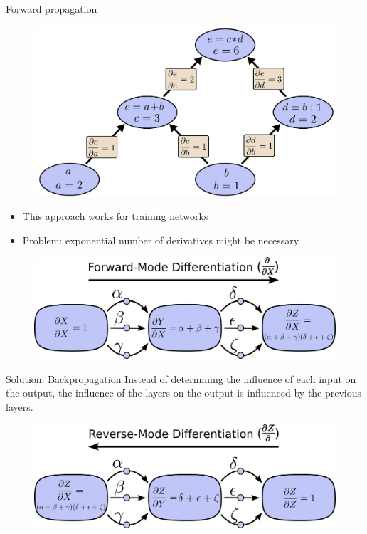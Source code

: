 \documentclass[12pt]{beamer}
\begin{document}
\begin{frame}{Forward propagation}
\begin{figure}
\centering
\includegraphics[width = 0.4\linewidth]{images/backprop3.png}

\label{fig:propagation}
\end{figure}
\begin{itemize}
\item This approach works for training networks
\item Problem: exponential number of derivatives might be necessary
\end{itemize}
\begin{figure}
\centering
\includegraphics[width = 0.5\linewidth]{images/backprop5.png}
\label{fig:propagation5}
\end{figure}
\end{frame}

\begin{frame}{Solution: Backpropagation}
Instead of determining the influence of each input on the output, the influence of the layers on the output is influenced by the previous layers.

\begin{figure}
\centering
\includegraphics[width = 0.6\linewidth]{images/backprop6.png}
\label{fig:propagation5}
\end{figure}

\end{frame}
\end{document}
